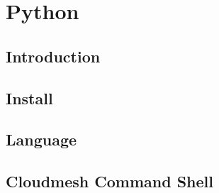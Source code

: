 
\part{Python}

\FILENAME



\chapter{Introduction}



\chapter{Install}





\chapter{Language}



\chapter{Cloudmesh Command Shell}



